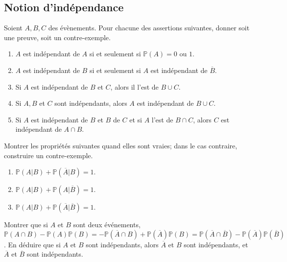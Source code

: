 





\subsection*{Notion d'indépendance}

\begin{exo}
Soient $A,B,C$ des évènements. Pour chacune des assertions suivantes, donner soit une preuve,
soit un contre-exemple.
\begin{enumerate}
    \item $A$ est indépendant de $A$ si et seulement si $\mathbb{P}(A)=0$ ou $1$.
    \item $A$ est indépendant de $B$  si et seulement si $A$ est indépendant de $\overline{B}$.
    \item Si $A$ est indépendant de $B$ et $C$, alors il l'est de $B\cup C$.
    \item Si $A, B$ et $C$ sont indépendants, alors $A$ est indépendant de $B\cup C$.
    \item Si $A$ est indépendant de $B$ et $B$ de $C$ et si $A$ l'est de
    $B\cap C$, alors $C$ est indépendant de $A\cap B.$
    \end{enumerate}
\end{exo}

\begin{exo}
Montrer les propriétés suivantes quand elles sont vraies; dans le cas 
con\-trai\-re, construire un contre-exemple.
\begin{enumerate} 
\item
$\mathbb P(A|B)+\mathbb P(\overline{A}|B)=1.$ 
\item
$\mathbb P(A|B)+\mathbb P(A|\overline{B})=1.$ 
\item
$\mathbb P(A|B)+\mathbb P(\overline{A}|\overline{B})=1.$ 
\end{enumerate}
\end{exo}


\begin{exo}
Montrer que si $A$ et $B$ sont deux événements, $\mathbb P(A \cap B)-\mathbb P(A)\mathbb P(B)=-\mathbb P(\overline{A} \cap B)+\mathbb P(\overline{A})\mathbb P(B)=\mathbb P(\overline{A} \cap \overline{B})-\mathbb P(\overline{A})\mathbb P(\overline{B})$.
En déduire que si $A$ et $B$ sont indépendants, alors $\overline{A}$ et $B$ sont indépendants, et $\overline{A}$ et $\overline{B}$ sont indépendants.
\end{exo}

